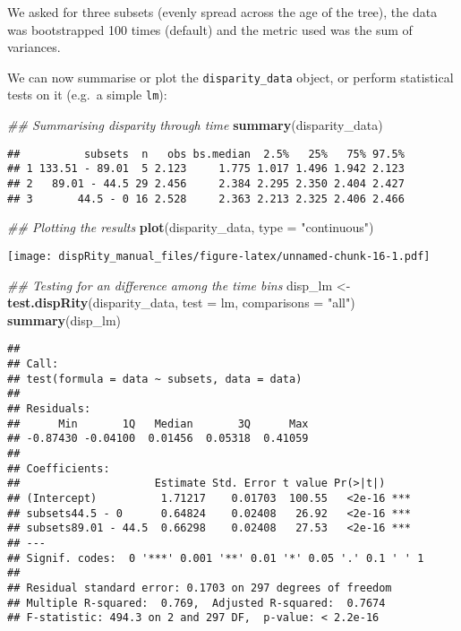 \documentclass[
]{book}
\newenvironment{Shaded}{\begin{snugshade}}{\end{snugshade}}
\newcommand{\CommentTok}[1]{\textcolor[rgb]{0.56,0.35,0.01}{\textit{#1}}}
\newcommand{\DataTypeTok}[1]{\textcolor[rgb]{0.13,0.29,0.53}{#1}}
\newcommand{\KeywordTok}[1]{\textcolor[rgb]{0.13,0.29,0.53}{\textbf{#1}}}
\newcommand{\NormalTok}[1]{#1}
\newcommand{\StringTok}[1]{\textcolor[rgb]{0.31,0.60,0.02}{#1}}
\begin{document}
We asked for three subsets (evenly spread across the age of the tree), the data was bootstrapped 100 times (default) and the metric used was the sum of variances.

We can now summarise or plot the \texttt{disparity\_data} object, or perform statistical tests on it (e.g.~a simple \texttt{lm}):

\begin{Shaded}
\begin{Highlighting}[]
\CommentTok{\#\# Summarising disparity through time}
\KeywordTok{summary}\NormalTok{(disparity\_data)}
\end{Highlighting}
\end{Shaded}

\begin{verbatim}
##          subsets  n   obs bs.median  2.5%   25%   75% 97.5%
## 1 133.51 - 89.01  5 2.123     1.775 1.017 1.496 1.942 2.123
## 2   89.01 - 44.5 29 2.456     2.384 2.295 2.350 2.404 2.427
## 3       44.5 - 0 16 2.528     2.363 2.213 2.325 2.406 2.466
\end{verbatim}

\begin{Shaded}
\begin{Highlighting}[]
\CommentTok{\#\# Plotting the results}
\KeywordTok{plot}\NormalTok{(disparity\_data, }\DataTypeTok{type =} \StringTok{"continuous"}\NormalTok{)}
\end{Highlighting}
\end{Shaded}

\texttt{[image: dispRity\_manual\_files/figure-latex/unnamed-chunk-16-1.pdf]}

\begin{Shaded}
\begin{Highlighting}[]
\CommentTok{\#\# Testing for an difference among the time bins}
\NormalTok{disp\_lm \textless{}{-}}\StringTok{ }\KeywordTok{test.dispRity}\NormalTok{(disparity\_data, }\DataTypeTok{test =}\NormalTok{ lm,}
                         \DataTypeTok{comparisons =} \StringTok{"all"}\NormalTok{)}
\KeywordTok{summary}\NormalTok{(disp\_lm)}
\end{Highlighting}
\end{Shaded}

\begin{verbatim}
## 
## Call:
## test(formula = data ~ subsets, data = data)
## 
## Residuals:
##      Min       1Q   Median       3Q      Max 
## -0.87430 -0.04100  0.01456  0.05318  0.41059 
## 
## Coefficients:
##                     Estimate Std. Error t value Pr(>|t|)    
## (Intercept)          1.71217    0.01703  100.55   <2e-16 ***
## subsets44.5 - 0      0.64824    0.02408   26.92   <2e-16 ***
## subsets89.01 - 44.5  0.66298    0.02408   27.53   <2e-16 ***
## ---
## Signif. codes:  0 '***' 0.001 '**' 0.01 '*' 0.05 '.' 0.1 ' ' 1
## 
## Residual standard error: 0.1703 on 297 degrees of freedom
## Multiple R-squared:  0.769,  Adjusted R-squared:  0.7674 
## F-statistic: 494.3 on 2 and 297 DF,  p-value: < 2.2e-16
\end{verbatim}
\end{document}
